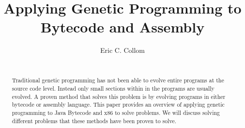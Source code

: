 \documentclass{sig-alternate}
\begin{document}
%

\title{Applying Genetic Programming to Bytecode and Assembly}
%
%
%
%
%
%
\author{
%
%
\alignauthor
Eric C. Collom \\
 \\
}

\maketitle
\begin{abstract}
Traditional genetic programming has not been able to evolve entire programs at the source code level. Instead only small sections within in the programs are usually evolved. A proven method that solves this problem is by evolving programs in either bytecode or assembly language. This paper provides an overview of applying genetic programming to Java Bytecode and x86 to solve problems. We will discuss solving different problems that these methods have been proven to solve.
\end{abstract}
\end{document}
